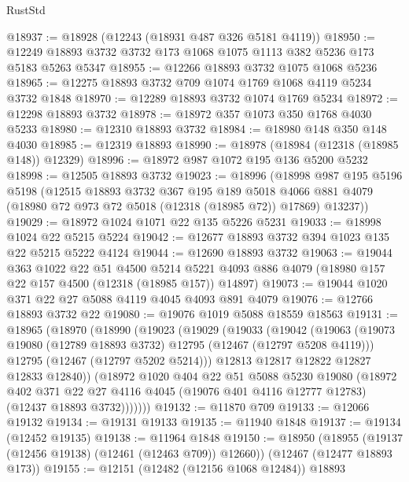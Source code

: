 \begin{lexlean}{RustStd}
\begin{coremodule}
@18937 := @18928 (@12243 (@18931 @487 @326 @5181 @4119))
@18950 := @12249 @18893 @3732 @3732 @173 @1068 @1075 @1113 @382 @5236 @173 @5183 @5263 @5347
@18955 := @12266 @18893 @3732 @1075 @1068 @5236
@18965 := @12275 @18893 @3732 @709 @1074 @1769 @1068 @4119 @5234 @3732 @1848
@18970 := @12289 @18893 @3732 @1074 @1769 @5234
@18972 := @12298 @18893 @3732
@18978 := @18972 @357 @1073 @350 @1768 @4030 @5233
@18980 := @12310 @18893 @3732
@18984 := @18980 @148 @350 @148 @4030
@18985 := @12319 @18893
@18990 := @18978 (@18984 (@12318 (@18985 @148)) @12329)
@18996 := @18972 @987 @1072 @195 @136 @5200 @5232
@18998 := @12505 @18893 @3732
@19023 := @18996
    (@18998
      @987
      @195
      @5196
      @5198
      (@12515
        @18893
        @3732
        @367
        @195
        @189
        @5018
        @4066
        @881
        @4079
        (@18980 @72 @973 @72 @5018 (@12318 (@18985 @72)) @17869)
        @13237))
@19029 := @18972 @1024 @1071 @22 @135 @5226 @5231
@19033 := @18998 @1024 @22 @5215 @5224
@19042 := @12677 @18893 @3732 @394 @1023 @135 @22 @5215 @5222 @4124
@19044 := @12690 @18893 @3732
@19063 := @19044
    @363
    @1022
    @22
    @51
    @4500
    @5214
    @5221
    @4093
    @886
    @4079
    (@18980 @157 @22 @157 @4500 (@12318 (@18985 @157)) @14897)
@19073 := @19044 @1020 @371 @22 @27 @5088 @4119 @4045 @4093 @891 @4079
@19076 := @12766 @18893 @3732 @22
@19080 := @19076 @1019 @5088 @18559 @18563
@19131 := @18965
    (@18970
      (@18990
        (@19023
          (@19029
            (@19033
              (@19042
                (@19063
                  (@19073 @19080 (@12789 @18893 @3732) @12795 (@12467 (@12797 @5208 @4119)))
                  @12795
                  (@12467 (@12797 @5202 @5214)))
                @12813
                @12817
                @12822
                @12827
                @12833
                @12840))
            (@18972
              @1020
              @404
              @22
              @51
              @5088
              @5230
              @19080
              (@18972
                @402
                @371
                @22
                @27
                @4116
                @4045
                (@19076 @401 @4116 @12777 @12783)
                (@12437 @18893 @3732)))))))
@19132 := @11870 @709
@19133 := @12066 @19132
@19134 := @19131 @19133
@19135 := @11940 @1848
@19137 := @19134 (@12452 @19135)
@19138 := @11964 @1848
@19150 := @18950
    (@18955 (@19137 (@12456 @19138) (@12461 (@12463 @709)) @12660))
    (@12467 (@12477 @18893 @173))
@19155 := @12151 (@12482 (@12156 @1068 @12484)) @18893

\end{coremodule}
\end{lexlean}
